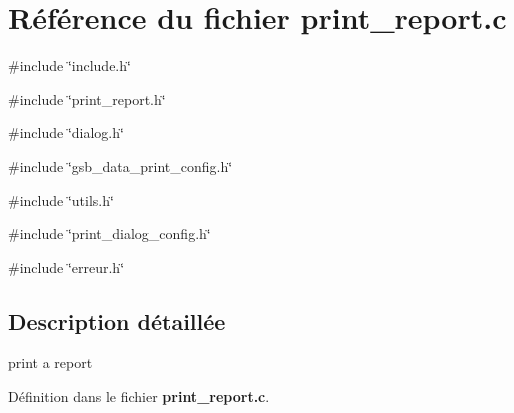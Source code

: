 \section{Référence du fichier print\_\-report.c}
\label{print__report_8c}
{\ttfamily \#include \char`\"{}include.h\char`\"{}}\par
{\ttfamily \#include \char`\"{}print\_\-report.h\char`\"{}}\par
{\ttfamily \#include \char`\"{}dialog.h\char`\"{}}\par
{\ttfamily \#include \char`\"{}gsb\_\-data\_\-print\_\-config.h\char`\"{}}\par
{\ttfamily \#include \char`\"{}utils.h\char`\"{}}\par
{\ttfamily \#include \char`\"{}print\_\-dialog\_\-config.h\char`\"{}}\par
{\ttfamily \#include \char`\"{}erreur.h\char`\"{}}\par


\subsection{Description détaillée}
print a report 

Définition dans le fichier {\bf print\_\-report.c}.

